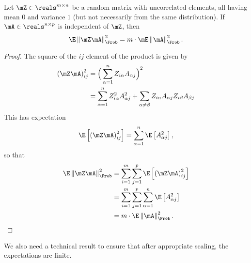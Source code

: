 \begin{lemma}\label{L:frob-random-product}
	Let $\mZ \in \reals^{m \times n}$ be a random matrix with uncorrelated
	elements, all having mean $0$ and variance $1$ (but not necessarily 
	from the same distribution).  If $\mA \in \reals^{n \times p}$ is 
	independent of $\mZ$, then
	\[
		\E \left\|
			\mZ \mA
		\right\|_\Frob^2
			=
				m
				\cdot
				\mE \left\| \mA \right\|_\Frob^2.
	\]
\end{lemma}
\begin{proof}
	The square of the $ij$ element of the product is given by
	\begin{align*}
		\left( \mZ \mA \right)_{ij}^2
			&=
				\Big(
					\sum_{\alpha=1}^n
						Z_{i \alpha} A_{\alpha j}
				\Big)^2 \\
			&=
				\sum_{\alpha=1}^n
					Z_{i \alpha}^2 A_{\alpha j}^2
				+
				\sum_{\alpha \neq \beta}
					Z_{i \alpha} A_{\alpha j}
					Z_{i \beta}  A_{\beta j}
	\end{align*}
	This has expectation
	\[
		\E \left[
			\left( \mZ \mA \right)_{ij}^2
		\right]
			=
				\sum_{\alpha=1}^n
					\E\left[ A_{\alpha j}^2 \right],
	\]
	so that
	\begin{align*}
		\E \left\|
			\mZ \mA
		\right\|_\Frob^2
			&=
				\sum_{i=1}^m
				\sum_{j=1}^p
					\E \left[
						\left( \mZ \mA \right)_{ij}^2
					\right] \\
			&=
				\sum_{i=1}^m
				\sum_{j=1}^p
					\sum_{\alpha=1}^n
						\E\left[ A_{\alpha j}^2 \right] \\
			&= m \cdot \E \left\| \mA \right\|_\Frob^2. \qedhere
	\end{align*}
\end{proof}

We also need a technical result to ensure that after appropriate scaling, the
expectations are finite.

